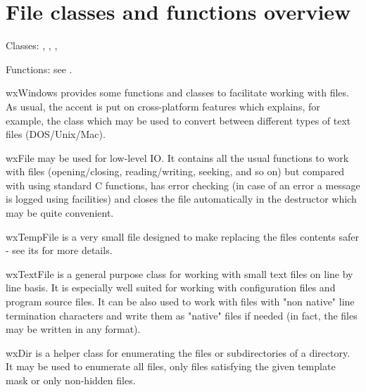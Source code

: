 \section{File classes and functions overview}\label{wxfileoverview}

Classes: , , , 

Functions: see .

wxWindows provides some functions and classes to facilitate working with files.
As usual, the accent is put on cross-platform features which explains, for
example, the  class which may be used to convert
between different types of text files (DOS/Unix/Mac).

wxFile may be used for low-level IO. It contains all the usual functions to work
with files (opening/closing, reading/writing, seeking, and so on) but compared with
using standard C functions, has error checking (in case of an error a message
is logged using  facilities) and closes the file
automatically in the destructor which may be quite convenient.

wxTempFile is a very small file designed to make replacing the files contents
safer - see its  for more details.

wxTextFile is a general purpose class for working with small text files on line
by line basis. It is especially well suited for working with configuration files
and program source files. It can be also used to work with files with "non
native" line termination characters and write them as "native" files if needed
(in fact, the files may be written in any format).

wxDir is a helper class for enumerating the files or subdirectories of a
directory. It may be used to enumerate all files, only files satisfying the
given template mask or only non-hidden files.

